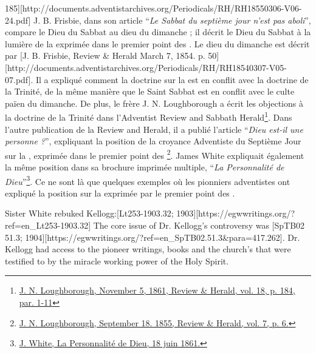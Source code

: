 185][http://documents.adventistarchives.org/Periodicals/RH/RH18550306-V06-24.pdf] J. B. Frisbie, dans son article “\textit{Le Sabbat du septième jour n'est pas aboli}”, compare le Dieu du Sabbat au dieu du dimanche ; il décrit le Dieu du Sabbat à la lumière de la  exprimée dans le premier point des . Le dieu du dimanche est décrit par [J. B. Frisbie, Review \& Herald March 7, 1854. p. 50][http://documents.adventistarchives.org/Periodicals/RH/RH18540307-V05-07.pdf]. Il a expliqué comment la doctrine sur la  est en conflit avec la doctrine de la Trinité, de la même manière que le Saint Sabbat est en conflit avec le culte païen du dimanche. De plus, le frère J. N. Loughborough a écrit les objections à la doctrine de la Trinité dans l'Adventist Review and Sabbath Herald\footnote{\href{https://adventistdigitallibrary.org/adl-349160/advent-review-and-sabbath-herald-november-5-1861}{J. N. Loughborough, November 5, 1861, Review \& Herald, vol. 18, p. 184, par. 1-11}}. Dans l'autre publication de la Review and Herald, il a publié l'article “\textit{Dieu est-il une personne ?}”, expliquant la position de la croyance Adventiste du Septième Jour sur la , exprimée dans le premier point des \footnote{\href{http://documents.adventistarchives.org/Periodicals/RH/RH18550918-V07-06.pdf}{J. N. Loughborough, September 18. 1855, Review \& Herald, vol. 7, p. 6.}}. James White expliquait également la même position dans sa brochure imprimée multiple, “\textit{La Personnalité de Dieu}”\footnote{\href{https://egwwritings.org/?ref=en_PERGO.1.1&para=1471.3}{J. White, La Personnalité de Dieu, 18 juin 1861.}}. Ce ne sont là que quelques exemples où les pionniers adventistes ont expliqué la position sur la  exprimée par le premier point des .


Sister White rebuked Kellogg:[Lt253-1903.32; 1903][https://egwwritings.org/?ref=en\_Lt253-1903.32] The core issue of Dr. Kellogg’s controversy was [SpTB02 51.3; 1904][https://egwwritings.org/?ref=en\_SpTB02.51.3&para=417.262]. Dr. Kellogg had access to the pioneer writings, books and the church's  that were testified to by the miracle working power of the Holy Spirit.


